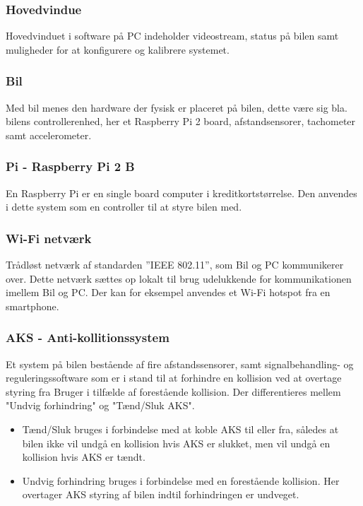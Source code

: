 \subsubsection{Hovedvindue}
Hovedvinduet i software på PC indeholder videostream, status på bilen samt muligheder for at konfigurere og kalibrere systemet.

\subsubsection{Bil}
Med bil menes den hardware der fysisk er placeret på bilen, dette være sig bla. bilens controllerenhed, her et Raspberry Pi 2 board, afstandsensorer, tachometer samt accelerometer.

\subsubsection{Pi - Raspberry Pi 2 B}
En Raspberry Pi er en single board computer i kreditkortstørrelse. Den anvendes i dette system som en controller til at styre bilen med.

\subsubsection{Wi-Fi netværk}
Trådløst netværk af standarden ''IEEE 802.11'', som Bil og PC kommunikerer over. Dette netværk sættes op lokalt til brug udelukkende for kommunikationen imellem Bil og PC. Der kan for eksempel anvendes et Wi-Fi hotspot fra en smartphone.

\subsubsection{AKS - Anti-kollitionssystem}
Et system på bilen bestående af fire afstandssensorer, samt signalbehandling- og reguleringssoftware som er i stand til at forhindre en kollision ved at overtage styring fra Bruger i tilfælde af forestående kollision. Der differentieres mellem "Undvig forhindring" og "Tænd/Sluk AKS".

\begin{itemize}
	\item Tænd/Sluk bruges i forbindelse med at koble AKS til eller fra, således at bilen ikke vil undgå en kollision hvis AKS er slukket, men vil undgå en kollision hvis AKS er tændt. 
	\item Undvig forhindring bruges i forbindelse med en forestående kollision. Her overtager AKS styring af bilen indtil forhindringen er undveget. 
\end{itemize}


